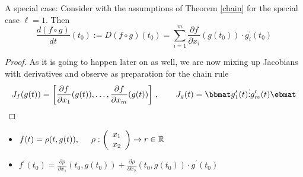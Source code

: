 %
A special case:
Consider with the assumptions of Theorem \ref{chain} for the special case $\ell=1$. Then
\[
\frac{d (f\circ g)}{d t}(t_0):=D(f\circ g)(t_0)=\sum_{i=1}^m\frac{\partial f}{\partial x_i}(g(t_0))\cdot g_i^\prime(t_0)
\]
\begin{proof}
	\blank 
	As it is going to happen later on as well, we are now mixing up Jacobians with derivatives and observe as preparation for the chain rule
	\[
	J_f(g(t))=\left[\frac{\partial f}{\partial x_1}(g(t)),\ldots,\frac{\partial f}{\partial x_m}(g(t))\right]\, , \qquad
	J_g(t)=\bbmat
	g_1^\prime(t)\\ \vdots \\g_m^\prime(t)
	\ebmat
	\] 
\end{proof}

\begin{bsp}
	\blank
	\begin{itemize}
		\item $f(t) = \rho(t,g(t)), \hspace{0.5cm} \rho: \left(\begin{array}{c}
		x_1\\
		x_2
		\end{array}\right) \rightarrow r\in \mathbb{R}$\\
		\item[] $f^\prime(t_0) = \frac{\partial\rho}{\partial x_1} (t_0,g(t_0)) + \frac{\partial\rho}{\partial x_2} (t_0,g(t_0))\cdot g^\prime (t_0)$
	\end{itemize}
\end{bsp}
\newpage




